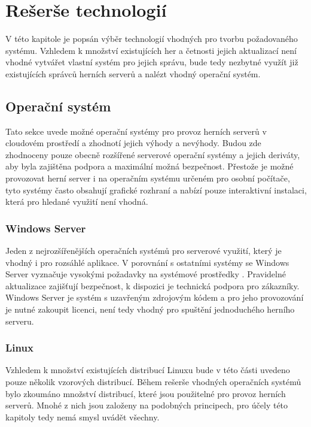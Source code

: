 \chapter{Rešerše technologií}

V této kapitole je popsán výběr technologií vhodných pro tvorbu požadovaného systému.
Vzhledem k množství existujících her a četnosti jejich aktualizací není vhodné vytvářet vlastní
systém pro jejich správu, bude tedy nezbytné využít již existujících správců herních serverů a nalézt vhodný
operační systém.

\section{Operační systém}

Tato sekce uvede možné operační systémy pro provoz herních serverů v cloudovém prostředí a zhodnotí
jejich výhody a nevýhody. Budou zde zhodnoceny pouze obecně rozšířené serverové operační systémy \cite{server_os_share} a jejich deriváty,
aby byla zajištěna podpora a maximální možná bezpečnost. Přestože je možné provozovat herní server i na operačním systému
určeném pro osobní počítače, tyto systémy často obsahují grafické rozhraní a nabízí pouze interaktivní instalaci, která
pro hledané využití není vhodná.


\subsection{Windows Server}

Jeden z nejrozšířenějších operačních systémů pro serverové využití, který je vhodný i pro rozsáhlé aplikace.
V porovnání s ostatními systémy se Windows Server vyznačuje vysokými požadavky na
systémové prostředky \cite{windows_server_reqs}. Pravidelné aktualizace zajišťují bezpečnost, k dispozici je technická
podpora pro zákazníky. Windows Server je systém s uzavřeným zdrojovým kódem a pro jeho provozování je nutné zakoupit licenci,
není tedy vhodný pro spuštění jednoduchého herního serveru.

\subsection{Linux}

Vzhledem k množství existujících distribucí Linuxu bude v této části uvedeno pouze několik vzorových distribucí.
Během rešerše vhodných operačních systémů bylo zkoumáno množství distribucí, které jsou použitelné pro provoz
herních serverů. Mnohé z nich jsou založeny na podobných principech, pro účely této kapitoly tedy nemá smysl uvádět všechny.


